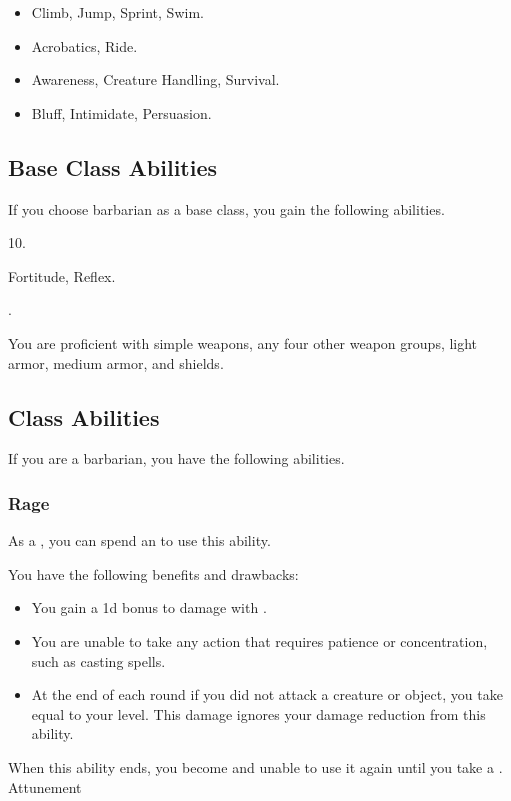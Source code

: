     \begin{itemize}
        \item {} Climb, Jump, Sprint, Swim.
        \item {} Acrobatics, Ride.
        \item {} Awareness, Creature Handling, Survival.
        \item {} Bluff, Intimidate, Persuasion.
    \end{itemize}

    \subsection{Base Class Abilities}
        If you choose barbarian as a base class, you gain the following abilities.

         10.

          Fortitude,  Reflex.

         .

        You are proficient with simple weapons, any four other weapon groups, light armor, medium armor, and shields.

    \subsection{Class Abilities}
        If you are a barbarian, you have the following abilities.

        \subsubsection{Rage}\label{Rage}
            As a , you can spend an  to use this ability.
            \begin{ability}
                \begin{spelleffects}
                    \spelleffect You have the following benefits and drawbacks:
                    \begin{itemize}
                        \item You gain a \plus1d bonus to damage with .
                        \item You are unable to take any action that requires patience or concentration, such as casting spells.
                        \item At the end of each round if you did not attack a creature or object, you take  equal to your level.
                            This damage ignores your damage reduction from this ability.
                    \end{itemize}
                    \spellspecial When this ability ends, you become \fatigued and unable to use it again until you take a .
                    \spelldur Attunement
                \end{spelleffects}
            \end{ability}

